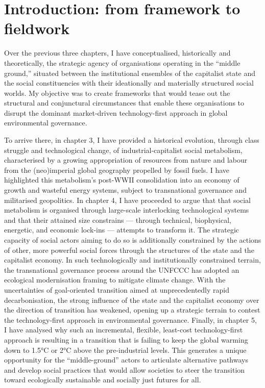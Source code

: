 \documentclass[a4paper, nobind]{templates/ociamthesis}
\begin{document}
\minitoc

\hypertarget{introduction-from-framework-to-fieldwork}{%
\section{Introduction: from framework to fieldwork}\label{introduction-from-framework-to-fieldwork}}

Over the previous three chapters, I have conceptualised, historically and theoretically, the strategic agency of organisations operating in the ``middle ground,'' situated between the institutional ensembles of the capitalist state and the social constituencies with their ideationally and materially structured social worlds. My objective was to create frameworks that would tease out the structural and conjunctural circumstances that enable these organisations to disrupt the dominant market-driven technology-first approach in global environmental governance.

To arrive there, in chapter 3, I have provided a historical evolution, through class struggle and technological change, of industrial-capitalist social metabolism, characterised by a growing appropriation of resources from nature and labour from the (neo)imperial global geography propelled by fossil fuels. I have highlighted this metabolism's post-WWII consolidation into an economy of growth and wasteful energy systems, subject to transnational governance and militarised geopolitics. In chapter 4, I have proceeded to argue that that social metabolism is organised through large-scale interlocking technological systems and that their attained size constrains --- through technical, biophysical, energetic, and economic lock-ins --- attempts to transform it. The strategic capacity of social actors aiming to do so is additionally constrained by the actions of other, more powerful social forces through the structures of the state and the capitalist economy. In such technologically and institutionally constrained terrain, the transnational governance process around the UNFCCC has adopted an ecological modernisation framing to mitigate climate change. With the uncertainties of goal-oriented transition aimed at unprecedentedly rapid decarbonisation, the strong influence of the state and the capitalist economy over the direction of transition has weakened, opening up a strategic terrain to contest the technology-first approach in environmental governance. Finally, in chapter 5, I have analysed why such an incremental, flexible, least-cost technology-first approach is resulting in a transition that is failing to keep the global warming down to 1.5°C or 2°C above the pre-industrial levels. This generates a unique opportunity for the ``middle-ground'' actors to articulate alternative pathways and develop social practices that would allow societies to steer the transition toward ecologically sustainable and socially just futures for all.
\end{document}
